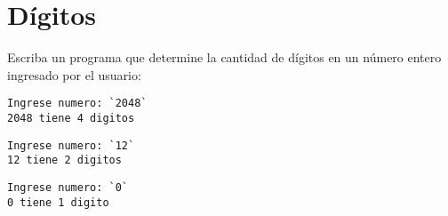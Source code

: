 \section{Dígitos}

Escriba un programa que determine la cantidad de dígitos en un número
entero ingresado por el usuario:

\begin{lstlisting}[language=testcase]
Ingrese numero: `2048`
2048 tiene 4 digitos
\end{lstlisting}

\begin{lstlisting}[language=testcase]
Ingrese numero: `12`
12 tiene 2 digitos
\end{lstlisting}

\begin{lstlisting}[language=testcase]
Ingrese numero: `0`
0 tiene 1 digito
\end{lstlisting}

